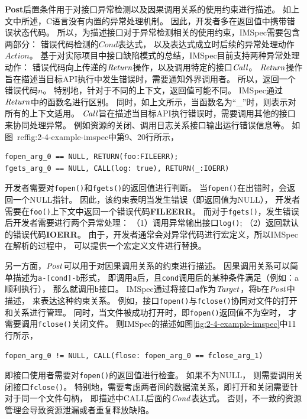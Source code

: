 \textbf{Post}后置条件用于对接口异常检测以及因果调用关系的使用约束进行描述。
如上文中所述，C语言没有内置的异常处理机制。
因此，开发者多在返回值中携带错误状态代码。
所以，为描述接口对于异常检测相关的使用约束，IMSpec需要包含两部分：
错误代码检测的$\mathit{Cond}$表达式，
以及表达式成立时后续的异常处理动作$\mathit{Action}$。
基于对实际项目中接口缺陷模式的总结，IMSpec目前支持两种异常处理动作：
错误代码向上传递的$\mathit{Return}$操作，以及调用特定的接口$\mathit{Call}$。
$\mathit{Return}$操作旨在描述当目标API执行中发生错误时，需要通知外界调用者。
所以，返回一个错误代码$n$。
特别地，针对于不同的上下文，返回值可能不同。
IMSpec通过$\mathit{Return}$中的函数名进行区别。
同时，如上文所示，当函数名为“\_”时，则表示对所有的上下文适用。
$\mathit{Call}$旨在描述当目标API执行错误时，需要调用其他的接口来协同处理异常。
例如资源的关闭、调用日志关系接口输出运行错误信息等。
如图~ref{fig:2-4-example-imspec}中第9、20行所示，
\begin{lstlisting}[language={[ANSI]C},
basicstyle=\linespread{0.8}\listingsfont,
numbers=none,
xleftmargin=.15\textwidth]
fopen_arg_0 == NULL, RETURN(foo:FILEERR);
fgets_arg_0 == NULL, CALL(log: true), RETURN(_:IOERR)
\end{lstlisting}
开发者需要对\texttt{fopen()}和\texttt{fgets()}的返回值进行判断。
当\texttt{fopen()}在出错时，会返回一个NULL指针。
因此，该约束表明当发生错误（即返回值为NULL），
开发者需要在\texttt{foo()}上下文中返回一个错误代码\textbf{FILEERR}。
而对于\texttt{fgets()}，发生错误后开发者需要进行两个异常处理：
（1）调用异常输出接口\texttt{log()};
（2）返回默认的错误代码\textbf{IOERR}。
由于，开发者通常会对异常代码进行宏定义，所以IMSpec在解析的过程中，
可以提供一个宏定义文件进行替换。

另一方面，$\mathit{Post}$可以用于对因果调用关系的约束进行描述。
因果调用关系可以简单描述为\texttt{a-[cond]-b}形式，
即调用\texttt{a}后，且\texttt{cond}调用后的某种条件满足（例如：a顺利执行），
那么就调用\texttt{b}接口。
IMSpec通过将接口\texttt{a}作为$\mathit{Target}$，将\texttt{b}在$\mathit{Post}$中描述，
来表达这种约束关系。
例如，接口\texttt{fopen()}与\texttt{fclose()}协同对文件的打开和关系进行管理。
同时，当文件被成功打开时，即\texttt{fopen()}返回值不为空时，
才需要调用\texttt{fclose()}关闭文件。
则IMSpec的描述如图\ref{fig:2-4-example-imspec}中11行所示，
\begin{lstlisting}[language={[ANSI]C},
basicstyle=\linespread{0.8}\listingsfont,
numbers=none,
xleftmargin=.15\textwidth]
fopen_arg_0 != NULL, CALL(flose: fopen_arg_0 == fclose_arg_1)
\end{lstlisting}
即接口使用者需要对\texttt{fopen()}的返回值进行检查。
如果不为NULL，
则需要调用关闭接口\texttt{fclose()}。
特别地，需要考虑两者间的数据流关系，即打开和关闭需要针对于同一个文件句柄，
即描述中CALL后面的$\mathit{Cond}$表达式。
否则，不一致的资源管理会导致资源泄漏或者重复释放缺陷。


